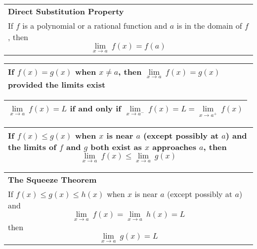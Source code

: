 \documentclass[fleqn]{article}
\begin{document}
\begin{center}
\def\arraystretch{1.3}
{\setlength{\tabcolsep}{16pt}
\begin{tabularx}{.9\textwidth}{|X|}
\hline
	\vspace{1pt}
	\textbf{Direct Substitution Property} \\
	If $f$ is a polynomial or a rational function and $a$ is in the domain of $f$, then
	$$\underset{x \to a}{\lim} \: f(x) = f(a)$$ \\
\hline
\end{tabularx}}
\vspace{12pt}

\def\arraystretch{1.3}
{\setlength{\tabcolsep}{16pt}
\begin{tabularx}{.9\textwidth}{|X|}
\hline
	\vspace{1pt}
	If $f(x) = g(x)$ when $x \ne a$, then \hspace{12pt} $\underset{x \to a}{\lim} \: f(x) = g(x)$ \hspace{12pt} provided the limits exist \\[16pt]
\hline
\end{tabularx}}
\vspace{12pt}

\def\arraystretch{1.3}
{\setlength{\tabcolsep}{16pt}
\begin{tabularx}{.9\textwidth}{|X|}
\hline
	\vspace{1pt}
	$\underset{x \to a}{\lim} \: f(x) = L$ \hspace{12pt} if and only if \hspace{12pt} $\underset{x \to a^-}{\lim} \: f(x) = L = \underset{x \to a^+}{\lim} \: f(x)$ \\[16pt]
\hline
\end{tabularx}}
\vspace{12pt}

\def\arraystretch{1.3}
{\setlength{\tabcolsep}{16pt}
\begin{tabularx}{.9\textwidth}{|X|}
\hline
	\vspace{1pt}
	If $f(x) \le g(x)$ when $x$ is near $a$ (except possibly at $a$) and the limits of $f$ and $g$ both exist as $x$ approaches $a$, then
	$$\underset{x \to a}{\lim} \: f(x) \le \underset{x \to a}{\lim} \: g(x)$$ \\
\hline
\end{tabularx}}
\vspace{12pt}

\def\arraystretch{1.3}
{\setlength{\tabcolsep}{16pt}
\begin{tabularx}{.9\textwidth}{|X|}
\hline
	\vspace{1pt}
	\textbf{The Squeeze Theorem} \\
	If $f(x) \le g(x) \le h(x)$ when $x$ is near $a$ (except possibly at $a$) and
	$$\underset{x \to a}{\lim} \: f(x) = \underset{x \to a}{\lim} \: h(x) = L$$
	then
	$$\underset{x \to a}{\lim} \: g(x) = L$$ \\
\hline
\end{tabularx}}
\vspace{32pt}
\pagebreak


\end{center}
\end{document}

